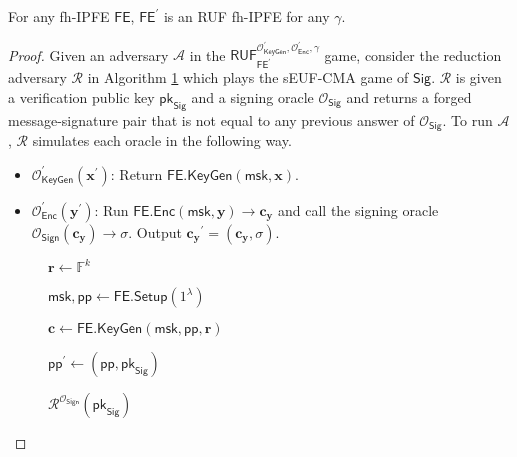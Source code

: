 \begin{theorem}

For any fh-IPFE $\textsf{FE}$, $\textsf{FE}^\prime$ is an RUF fh-IPFE for any $\gamma$.

\end{theorem}

\begin{proof}

Given an adversary $\mathcal{A}$ in the $\textsf{RUF}^{\mathcal{O}_{\textsf{KeyGen}}^\prime, \mathcal{O}_{\textsf{Enc}}^\prime, \gamma}_{\textsf{FE}^\prime}$ game, consider the reduction adversary $\mathcal{R}$ in Algorithm \ref{alg:red:sEUF-CMA:RUF} which plays the \textsf{sEUF-CMA} game of $\textsf{Sig}$. $\mathcal{R}$ is given a verification public key $\textsf{pk}_{\textsf{Sig}}$ and a signing oracle $\mathcal{O}_{\textsf{Sig}}$ and returns a forged message-signature pair that is not equal to any previous answer of $\mathcal{O}_{\textsf{Sig}}$. To run $\mathcal{A}$, $\mathcal{R}$ simulates each oracle in the following way.

\begin{itemize}
	\item $\mathcal{O}_{\textsf{KeyGen}}^\prime(\mathbf{x}^\prime)$: Return $\textsf{FE.KeyGen}(\textsf{msk}, \mathbf{x})$.

	\item $\mathcal{O}_{\textsf{Enc}}^\prime(\mathbf{y}^\prime)$: Run $\textsf{FE.Enc}(\textsf{msk}, \mathbf{y}) \to \mathbf{c_y}$ and call the signing oracle $\mathcal{O}_{\textsf{Sign}}(\mathbf{c_y}) \to \sigma$. Output $\mathbf{c_y}^\prime = (\mathbf{c_y}, \sigma)$.
\end{itemize}

\begin{figure}[h]
\centering
	
	\begin{minipage}[t]{0.5\linewidth}
	\centering
	\begin{algorithm}[H]
	\caption{$\mathcal{R}^{\mathcal{O}_{\textsf{Sign}}}( \textsf{pk}_{\textsf{Sig}} )$}
	\label{alg:red:sEUF-CMA:RUF}
	\begin{algorithmic}[1]

		\State $\mathbf{r} \gets \mathbb{F}^k$

		\State $\textsf{msk}, \textsf{pp} \gets \textsf{FE.Setup}(1^\lambda)$

		\State $\mathbf{c} \gets \textsf{FE.KeyGen}(\textsf{msk}, \textsf{pp}, \mathbf{r})$

		\State $\textsf{pp}^\prime \gets (\textsf{pp}, \textsf{pk}_{\textsf{Sig}})$


\end{algorithmic}
\end{algorithm}
\end{minipage}
\end{figure}
\end{proof}
